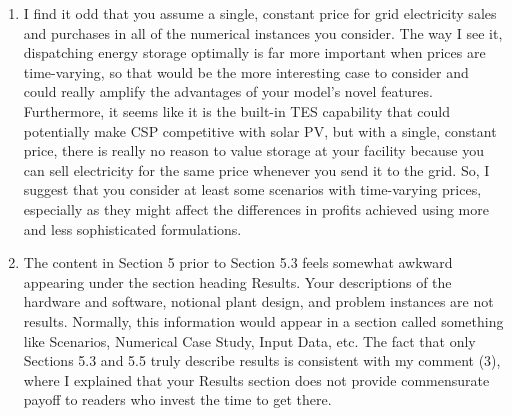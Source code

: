 \documentclass[10pt]{article}
\begin{document}
\begin{enumerate}

\item I find it odd that you assume a single, constant price for grid electricity
sales and purchases in all of the numerical instances you consider. The way I
see it, dispatching energy storage optimally is far more important when prices
are time-varying, so that would be the more interesting case to consider and
could really amplify the advantages of your model's novel features.
Furthermore, it seems like it is the built-in TES capability that could
potentially make CSP competitive with solar PV, but with a single, constant
price, there is really no reason to value storage at your facility because you
can sell electricity for the same price whenever you send it to the grid. So, I
suggest that you consider at least some scenarios with time-varying prices,
especially as they might affect the differences in profits achieved using more
and less sophisticated formulations.


\item The content in Section 5 prior to Section 5.3 feels somewhat awkward
appearing under the section heading Results. Your descriptions of the hardware
and software, notional plant design, and problem instances are not results.
Normally, this information would appear in a section called something like
Scenarios, Numerical Case Study, Input Data, etc. The fact that only Sections
5.3  and 5.5 truly describe results is consistent with my comment (3), where I
explained that your Results section does not provide commensurate payoff to
readers who invest the time to get there.


\end{enumerate}
\end{document}
